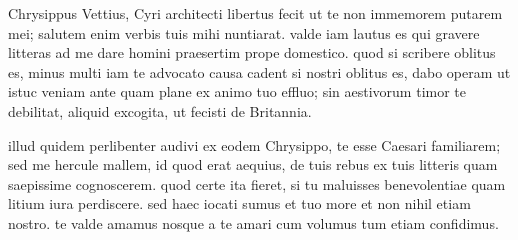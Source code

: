 


 Chrysippus Vettius, Cyri architecti libertus fecit ut te non immemorem putarem mei; salutem enim verbis tuis mihi nuntiarat. valde iam lautus es qui gravere litteras ad me dare homini praesertim prope domestico. quod si scribere oblitus es, minus multi iam te advocato causa cadent si nostri oblitus es, dabo operam ut istuc veniam ante quam plane ex animo tuo effluo; sin aestivorum timor te debilitat, aliquid excogita, ut fecisti de Britannia.

 illud quidem perlibenter audivi ex eodem Chrysippo, te esse Caesari familiarem; sed me hercule mallem, id quod erat aequius, de tuis rebus ex tuis litteris quam saepissime cognoscerem. quod certe ita fieret, si tu maluisses benevolentiae quam litium iura perdiscere. sed haec iocati sumus et tuo more et non nihil etiam nostro. te valde amamus nosque a te amari cum volumus tum etiam confidimus.

